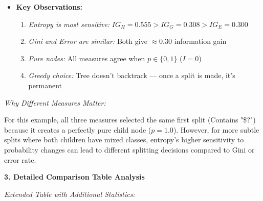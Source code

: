 \documentclass[12pt]{article}
\begin{document}
\begin{explanation}
\begin{itemize}
    \item \textbf{Key Observations:}
    \begin{enumerate}
        \item \textit{Entropy is most sensitive:} $IG_H = 0.555 > IG_G = 0.308 > IG_E = 0.300$
        \item \textit{Gini and Error are similar:} Both give $\approx 0.30$ information gain
        \item \textit{Pure nodes:} All measures agree when $p \in \{0, 1\}$ ($I = 0$)
        \item \textit{Greedy choice:} Tree doesn't backtrack — once a split is made, it's permanent
    \end{enumerate}
\end{itemize}

\textit{Why Different Measures Matter:}

For this example, all three measures selected the same first split (Contains "\$?") because it creates a perfectly pure child node ($p=1.0$). However, for more subtle splits where both children have mixed classes, entropy's higher sensitivity to probability changes can lead to different splitting decisions compared to Gini or error rate.

\textbf{3. Detailed Comparison Table Analysis}

\textit{Extended Table with Additional Statistics:}


\end{explanation}
\end{document}
